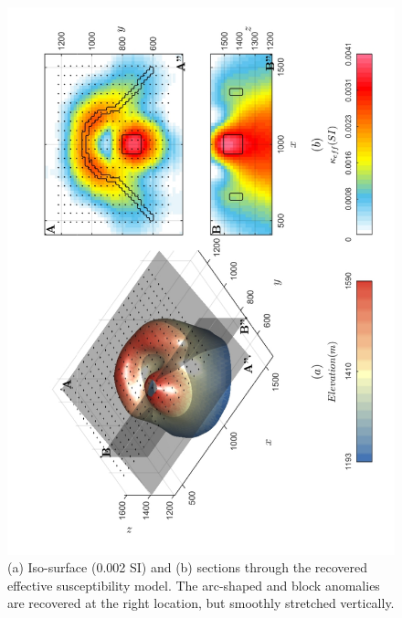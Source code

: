 \newpage
\begin{figure}[h!]
\centering
\includegraphics[scale=0.52, angle =270]{3D_Inv_l2l2_model_kEff.pdf}
\caption{ (a) Iso-surface (0.002 SI) and (b) sections through the recovered effective susceptibility model. The arc-shaped and block anomalies are recovered at the right location, but smoothly stretched vertically.}
\label{fig:3D_Inv_l2l2_model_kEff}
\end{figure}
